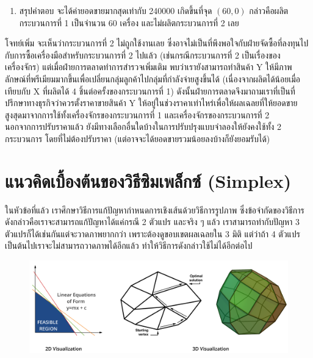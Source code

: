 \begin{solution}
\begin{enumerate}[label=\textbf{ขั้นที่ \arabic*:}, align=left, labelwidth=5em, labelsep=1em, leftmargin=*, itemsep=16pt, topsep=0pt, parsep=0pt, partopsep=0pt]
    \item สรุปคำตอบ จะได้ค่ายอดขายมากสุดเท่ากับ 240000 เกิดขึ้นที่จุด $(60,0)$ กล่าวคือผลิตกระบวนการที่ 1 เป็นจำนวน 60 เครื่อง และไม่ผลิตกระบวนการที่ 2 เลย
    \end{enumerate}
    \begin{remark}
        {โจทย์เพิ่ม}{}
        จะเห็นว่ากระบวนการที่ 2 ไม่ถูกใช้งานเลย ซึ่งอาจไม่เป็นที่พึงพอใจกับฝ่ายจัดซื้อที่ลงทุนไปกับการซื้อเครื่องมือสำหรับกระบวนการที่ 2 ไปแล้ว (เช่นกรณีกระบวนการที่ 2 เป็นเรื่องของเครื่องจักร) แต่เมื่อฝ่ายการตลาดทำการสำรวจเพิ่มเติม พบว่าเรายังสามารถทำสินค้า Y ให้มีภาพลักษณ์ที่พรีเมียมมากขึ้นเพื่อเปลี่ยนกลุ่มลูกค้าไปกลุ่มที่กำลังจ่ายสูงขึ้นได้ (เนื่องจากผลิตได้น้อยเมื่อเทียบกับ X ที่ผลิตได้ 4 ชิ้นต่อครั้งของกระบวนการที่ 1) ดังนั้นฝ่ายการตลาดจึงมาถามเราที่เป็นที่ปรึกษาทางธุรกิจว่าควรตั้งราคาขายสินค้า Y ให้อยู่ในช่วงราคาเท่าไหร่เพื่อให้ผลเฉลยที่ให้ยอดขายสูงสุดมาจากการใช้ทั้งเครื่องจักรของกระบวนการที่ 1 และเครื่องจักรของกระบวนการที่ 2\\

        นอกจากการปรับราคาแล้ว ยังมีทางเลือกอื่นใดบ้างในการปรับปรุงแบบจำลองให้ยังคงใช้ทั้ง 2 กระบวนการ โดยที่ไม่ต้องปรับราคา (แต่อาจจะได้ยอดขายรวมน้อยลงบ้างก็ยังยอมรับได้)
    \end{remark}
\end{solution}

\section{แนวคิดเบื้องต้นของวิธีซิมเพล็กซ์ (Simplex)}
ในหัวข้อที่แล้ว เราศึกษาวิธีการแก้ปัญหากำหนดการเชิงเส้นด้วยวิธีการรูปภาพ ซึ่งข้อจำกัดของวิธีการดังกล่าวคือเราจะสามารถแก้ปัญหาได้แค่กรณี 2 ตัวแปร และจริง ๆ แล้ว เราสามารถทำกับปัญหา 3 ตัวแปรก็ได้เช่นกันแต่จะวาดภาพยากกว่า เพราะต้องดูขอบเขตผลเฉลยใน 3 มิติ แต่ว่าถ้า 4 ตัวแปรเป็นต้นไปเราจะไม่สามารถวาดภาพได้อีกแล้ว ทำให้วิธีการดังกล่าวใช้ไม่ได้อีกต่อไป

\begin{figure}[h]
    \centering
    \includegraphics[width=1\linewidth]{simplex1.png}
\end{figure}

